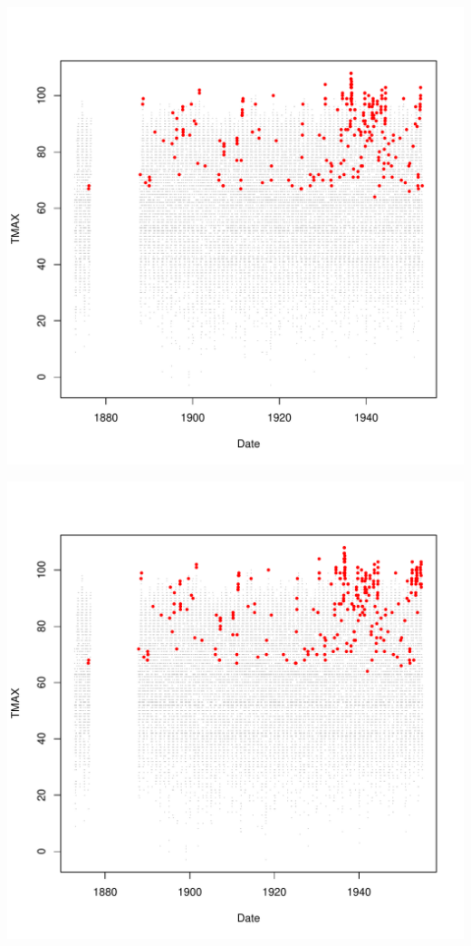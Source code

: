 \documentclass{article}\usepackage[]{graphicx}\usepackage[]{color}
\makeatletter
\def\maxwidth{ %
  \ifdim\Gin@nat@width>\linewidth
    \linewidth
  \else
    \Gin@nat@width
  \fi
}
\newenvironment{knitrout}{}{} %
\makeatother
\begin{document}
\begin{knitrout}
\includegraphics[width=\maxwidth]{figure/unnamed-chunk-4-36} 

\includegraphics[width=\maxwidth]{figure/unnamed-chunk-4-37} 


\end{knitrout}
\end{document}
